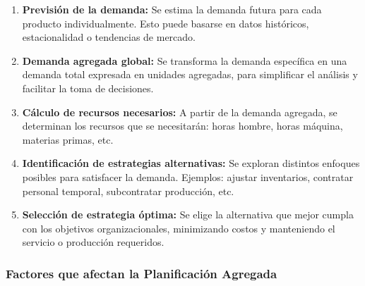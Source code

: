 \documentclass[a4paper,oneside,11pt]{article}
\begin{document}
\begin{enumerate}
    \item \textbf{Previsión de la demanda:} Se estima la demanda futura para cada producto individualmente. Esto puede basarse en datos históricos, estacionalidad o tendencias de mercado.
    \item \textbf{Demanda agregada global:} Se transforma la demanda específica en una demanda total expresada en unidades agregadas, para simplificar el análisis y facilitar la toma de decisiones.
    \item \textbf{Cálculo de recursos necesarios:} A partir de la demanda agregada, se determinan los recursos que se necesitarán: horas hombre, horas máquina, materias primas, etc.
    \item \textbf{Identificación de estrategias alternativas:} Se exploran distintos enfoques posibles para satisfacer la demanda. Ejemplos: ajustar inventarios, contratar personal temporal, subcontratar producción, etc.
    \item \textbf{Selección de estrategia óptima:} Se elige la alternativa que mejor cumpla con los objetivos organizacionales, minimizando costos y manteniendo el servicio o producción requeridos.
\end{enumerate}

\subsubsection{Factores que afectan la Planificación Agregada}
\end{document}
